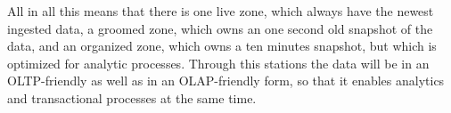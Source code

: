 All in all this means that there is one live zone, which always have the newest ingested data, a groomed zone, which owns an one second old snapshot of the data, and an organized zone, which owns a ten minutes snapshot, but which is optimized for analytic processes. Through this stations the data will be in an OLTP-friendly as well as in an OLAP-friendly form, so that it enables analytics and transactional processes at the same time. 


